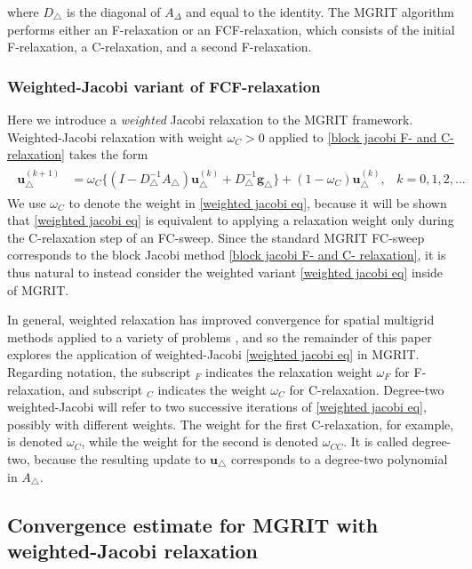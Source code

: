 \documentclass[VANCOUVER,STIX1COL]{WileyNJD-v2}
\begin{document}
where $D_\triangle$ is the diagonal of $A_\Delta$ and equal to the identity.
The MGRIT algorithm performs either an F-relaxation or an FCF-relaxation, which consists of the initial F-relaxation, a C-relaxation, and a second F-relaxation.

\subsubsection{Weighted-Jacobi variant of FCF-relaxation}
Here we introduce a \emph{weighted} Jacobi relaxation to the MGRIT framework. Weighted-Jacobi relaxation with weight $\omega_C > 0$ applied to \eqref{block jacobi F- and C- relaxation} takes the form
\begin{align}  \label{weighted jacobi eq}
\begin{split}
\mathbf{u}_\triangle^{(k + 1)} &= \omega_C \{(I - D_\triangle^{-1}A_\triangle) \mathbf{u}_\triangle^{(k)} + D_\triangle^{-1} \mathbf{g}_\triangle\} + (1 - \omega_C) \mathbf{u}_\triangle^{(k)}, \hspace{10pt} k = 0,1,2,... 
\end{split}
\end{align}
We use $\omega_C$ to denote the weight in \eqref{weighted jacobi eq}, because it will be shown that \eqref{weighted jacobi eq} is equivalent to applying a relaxation weight only during the C-relaxation step of an FC-sweep. Since the standard MGRIT FC-sweep corresponds to the block Jacobi method \eqref{block jacobi F- and C- relaxation}, it
is thus natural to instead consider the weighted variant \eqref{weighted jacobi eq} inside of MGRIT.  

In general, weighted relaxation has improved convergence for spatial multigrid methods applied to a variety of problems {\cite{AdBrHuTu2003,BaFaKoYa2011,TrOo2001,BrHeMc2000}}, and so the remainder of this paper explores the application of weighted-Jacobi \eqref{weighted jacobi eq} in MGRIT.
Regarding notation, the subscript $_F$ indicates the relaxation weight $\omega_F$ for F-relaxation, and subscript $_C$ indicates the weight $\omega_C$ for C-relaxation. Degree-two weighted-Jacobi will refer to two successive iterations of \eqref{weighted jacobi eq}, possibly with different weights.  The weight for the first C-relaxation{, for example,} is denoted $\omega_C$, while the weight for the second is denoted $\omega_{CC}$.
It is called degree-two, because the resulting update to
$\mathbf{u}_\triangle$ corresponds to a degree-two polynomial in $A_\triangle$.


\subsection{Convergence estimate for MGRIT with weighted-Jacobi relaxation}
\end{document}
